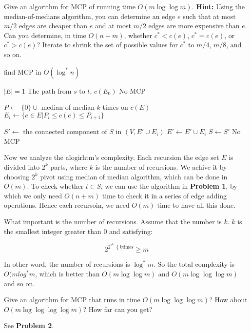 \documentclass[11pt,a4paper,oneside]{article}
\begin{document}
\begin{problem}{2}
	\statement
	Give an algorithm for MCP of running time $O(m \log \log m)$. \textbf{Hint:} Using the median-of-medians algorithm,
	you can determine an edge $e$ such that at most $m/2$ edges are cheaper than $e$ and at most $m/2$ edges are
	more expensive than $e$. Can you determine, in time $O(n+m)$, whether $c^* < c(e)$, $c^* = c(e)$, or $c^* > c(e)$?
	Iterate to shrink the set of possible
	values for $c^*$ to $m/4$, $m/8$, and so on.

	\solution
	
	\begin{algorithm}
		\caption{find MCP in $O(\log^* n)$}
		\begin{algorithmic}[1]
			\If $|E| = 1$
				\If {some $s$ and $t$ are connected in $(V, E \cup E')$}
					\State \Return The path from $s$ to $t$, $c(E_0)$
				\Else
					\State \Return No MCP
				\EndIf
			\EndIf
			
			\State $P \gets$ $\{0\} \cup$ median of median $k$ times on $c(E)$
			\State $E_i \gets \{e \in E | P_i \leq c(e) \leq P_{i+1} \}$

				\State $S' \gets$ the connected component of $S$ in $(V, E' \cup E_i)$
					\State {}
				\EndIf
				\State $E' \gets E' \cup E_i$
				\State $S \gets S'$
			\EndFor
			\State \Return No MCP
			\EndFunction
		\end{algorithmic}
	\end{algorithm}

	Now we analyze the alogirhtm's complexity. Each recursion the edge set \(E\) is divided into \(2^k\) parts, where \(k\) is the number of recursions. We achive it by choosing \(2^k\) pivot using median of median algorithm, which can be done in \(O(m)\). To check whether \(t \in S\), we can use the algorithm in \textbf{Problem 1}, by which we only need \(O(n+m)\) time to check it in a series of edge adding operations. Hence each recursoin, we need \(O(m)\) time to have all this done.
	
	What important is the number of recursions. Assume that the number is \(k\). \(k\) is the smallest integer greater than \(0\) and satisfying:
	
	\[2^{2^{2^{2^{\dots}}} \left\{k \text{times} \right.} \geq m\]
	
	In other word, the number of recursions is \(\log^* m\). So the total complexity is \(O(mlog^*m\), which is better than \(O(m\log\log m)\) and \(O(m\log\log\log m)\) and so on.
	
\end{problem}
\begin{problem}{3}
	\statement
	Give an algorithm for MCP that runs in time $O(m \log \log \log m)$? How about $O(m \log \log \log \log m)$? How far can you get?
	
	\solution
	
	See \textbf{Problem 2}.

\end{problem}
\end{document}
